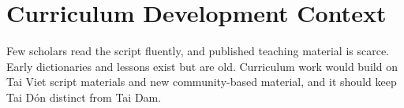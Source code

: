 \documentclass[12pt]{article}
\begin{document}
\section{Curriculum Development Context}
Few scholars read the script fluently, and published teaching material is scarce. Early dictionaries and lessons exist but are old. Curriculum work would build on Tai Viet script materials and new community-based material, and it should keep Tai D\'on distinct from Tai Dam.
\end{document}
